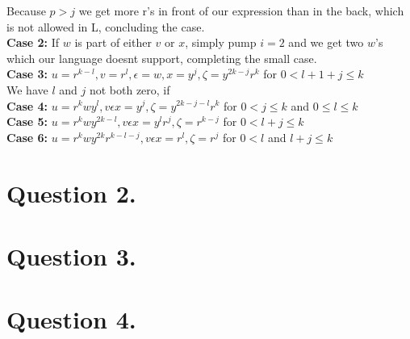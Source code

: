 \documentclass{article}
\theoremstyle{remark}
\numberwithin{equation}{section}
\begin{document}
Because $p>j$ we get more r's in front of our expression than in the back, which is not allowed in L, concluding the case.\\
\textbf{Case 2:} If $w$ is part of either $v$ or $x$, simply pump $i = 2$ and we get two $w$'s which our language doesnt support, completing the small case.\\
\textbf{Case 3:} $u = r^{k-l}, v = r^l, \epsilon = w, x = y^j, \zeta = y^{2k-j}r^k$ for $0<l+1+j\leq k$\\
We have $l$ and $j$ not both zero, if \\
\textbf{Case 4:} $u = r^{k}wy^l, v\epsilon x = y^j, \zeta = y^{2k-j-l}r^k$ for $0<j\leq k$ and $0\leq l \leq k$\\
\textbf{Case 5:} $u = r^{k}wy^{2k-l}, v\epsilon x = y^lr^j, \zeta = r^{k-j}$ for $0<l+j\leq k$\\
\textbf{Case 6:} $u = r^{k}wy^{2k}r^{k-l-j}, v\epsilon x = r^l, \zeta = r^{j}$ for $0<l$ and $l+j\leq k$\\
\section*{Question 2.}

\section*{Question 3.}

\section*{Question 4.}
\end{document}
